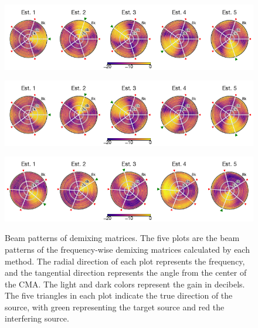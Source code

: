 \documentclass[sip,biber]{now-journal}
\begin{document}
\begin{figure}[t]
  \centering
  \begin{minipage}[t]{\linewidth}
    \centering\includegraphics{figures/plots/beam-pattern/ref.pdf}\label{fig:plot:bp:ref}
  \end{minipage}
  \begin{minipage}[t]{\linewidth}
    \centering\includegraphics{figures/plots/beam-pattern/rot_sfiiva-o.pdf}\label{fig:plot:bp:sfiivao}
  \end{minipage}
  \begin{minipage}[t]{\linewidth}
    \centering\includegraphics{figures/plots/beam-pattern/rot_sfiiva-m.pdf}\label{fig:plot:bp:sfiivam}
  \end{minipage}
  \caption{%
    Beam patterns of demixing matrices.
    The five plots are the beam patterns of the frequency-wise demixing matrices calculated by each method.
    The radial direction of each plot represents the frequency, and the tangential direction represents the angle from the center of the CMA.
    The light and dark colors represent the gain in decibels.
    The five triangles in each plot indicate the true direction of the source, with green representing the target source and red the interfering source.
  }%
  \label{fig:plot:beam}
\end{figure}
\end{document}
